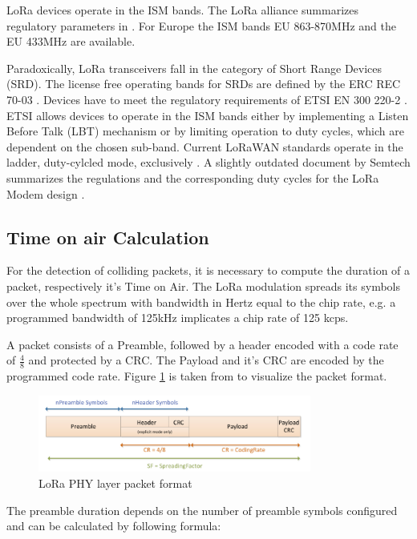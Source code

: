 \documentclass{article}
\begin{document}
LoRa devices operate in the ISM bands. The LoRa alliance summarizes regulatory
parameters in \cite{lorawanregparams}. For Europe the ISM bands EU 863-870MHz
and the EU 433MHz are available.

Paradoxically, LoRa transceivers fall in the category of Short Range Devices
(SRD). The license free operating bands for SRDs are defined by the ERC REC
70-03 \cite{recommendation200970}. Devices have to meet the regulatory
requirements of ETSI EN 300 220-2 \cite{etsisrd2018}. ETSI allows devices to
operate in the ISM bands either by implementing a Listen Before Talk (LBT)
mechanism or by limiting operation to duty cycles, which are dependent on the
chosen sub-band. Current LoRaWAN standards operate in the ladder, duty-cylcled
mode, exclusively \cite{lorawanregparams}. A slightly outdated document by
Semtech summarizes the regulations and the corresponding duty cycles for the
LoRa Modem design \cite{loraetsicompliance}.

\subsection{Time on air Calculation}
For the detection of colliding packets, it is necessary to compute the duration
of a packet, respectively it's Time on Air. The LoRa modulation spreads its
symbols over the whole spectrum with bandwidth in Hertz equal to the chip rate,
e.g. a programmed bandwidth of 125kHz implicates a chip rate of 125 kcps.

A packet consists of a Preamble, followed by a header encoded with a code rate
of $\frac{4}{8}$ and protected by a CRC. The Payload and it's CRC are encoded
by the programmed code rate. Figure \ref{fig:packetformat} is taken from
\cite{loramodem} to visualize the packet format.

\begin{figure}
    \centering
    \includegraphics[width=0.8\textwidth]{./figures/packet_format}
    \caption{LoRa PHY layer packet format \cite{loramodem}}
    \label{fig:packetformat}
\end{figure}

The preamble duration depends on the number of preamble symbols configured and
can be calculated by following formula:
\end{document}
